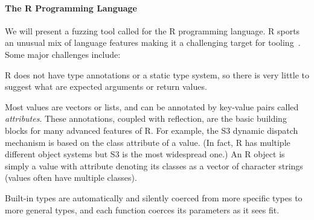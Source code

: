 \documentclass[sigplan,anonymous,review]{acmart}
\begin{document}
\paragraph{The R Programming Language}

We will present a fuzzing tool called \tool for the R programming language.
R sports an unusual mix of language features making it a challenging target for
tooling~\cite{morandat2012evaluating}. 
Some major challenges include:

\begin{compactitem}[$-$]

\item R does not have type annotations or a static type system, so there is very little to suggest what are expected arguments or return values.

\item Most values are vectors or lists, and can be annotated by key-value pairs called \textit{attributes}. 
These annotations, coupled with reflection, are the basic building blocks for many advanced features of R. 
For example, the S3 dynamic dispatch mechanism is based on the class attribute of a value.
(In fact, R has multiple different object systems but S3 is the most widespread one.)
An R object is simply a value with  attribute denoting its classes as a vector of character strings (values often have multiple classes).

\item Built-in types are automatically and silently coerced from more specific types to more general types, and each function coerces its parameters as it sees fit.




\end{compactitem}
\end{document}
